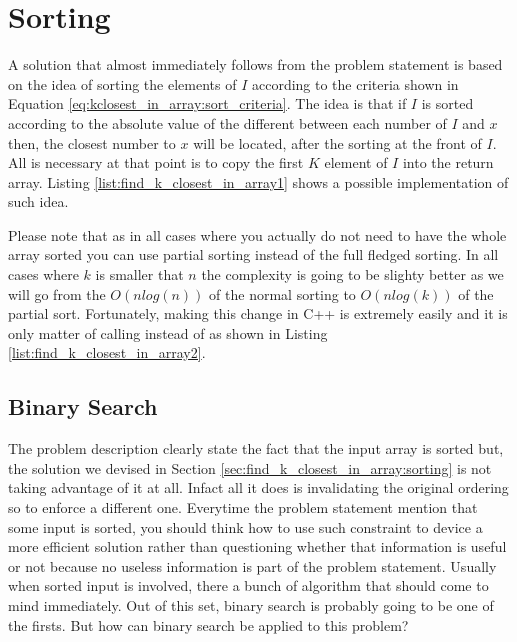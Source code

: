 \section{Sorting}
\label{find_k_closest_in_array:sec:sorting}
A solution that almost immediately follows from the problem statement is based on the idea of sorting the elements of $I$ according to the criteria shown in Equation \ref{eq:kclosest_in_array:sort_criteria}.
The idea is that if $I$ is sorted according to the absolute value of the different between each number of $I$ and $x$ then, the closest number to $x$ will be located, after the sorting at the front of $I$.
All is necessary at that point is to copy the first $K$ element of $I$ into the return array.
Listing \ref{list:find_k_closest_in_array1} shows a possible implementation of such idea. 


Please note that as in all cases where you actually do not need to have the whole array sorted you can use partial sorting instead of the full fledged sorting. In all cases where $k$ is smaller that $n$ the complexity is going to be slighty better as
we will go from the $O(nlog(n))$ of the normal sorting to $O(nlog(k))$ of the partial sort. 
Fortunately, making this change in C++ is extremely easily and it is only matter of calling  instead of  as shown in Listing \ref{list:find_k_closest_in_array2}.



\subsection{Binary Search}
\label{find_k_closest_in_array:sec:binary_search}
The problem description clearly state the fact that the input array is sorted but, the solution we devised in Section \ref{sec:find_k_closest_in_array:sorting} is not taking advantage of it at all. Infact all it does is invalidating
the original ordering so to enforce a different one. Everytime the problem statement mention that some input is sorted, you should think how to use such constraint to device a more efficient solution rather than questioning whether that information is useful or not because 
no useless information is part of the problem statement. Usually when sorted input is involved, there a bunch of algorithm that should come to mind immediately. Out of this set, binary search is probably going to be one of the firsts.
But how can binary search be applied to this problem?

